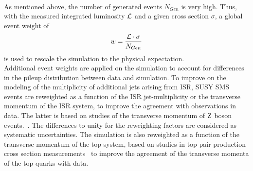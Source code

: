 \\
As mentioned above, the number of generated events $N_{Gen}$ is very high. Thus, with the measured integrated luminosity $\mathcal{L}$ and a given cross section $\sigma$, a global event weight of
\begin{equation}
 w = \frac{\mathcal{L} \cdot \sigma}{N_{Gen}}
\end{equation}
is used to rescale the simulation to the physical expectation.\\
Additional event weights are applied on the simulation to account for differences in the pileup distribution between data and simulation. To improve on the \MADGRAPH modeling of the multiplicity of additional jets arising from ISR, SUSY SMS events are reweighted as a function of the ISR jet-multiplicity or the transverse momentum of the ISR system, to improve the agreement with observations in data.
The latter is based on studies of the transverse momentum of $\mathrm{Z}$ boson events.~\cite{NISRweight}.
The differences to unity for the reweighting factors are considered as systematic uncertainties.
The \POWHEG \ttbar simulation is also reweighted as a function of the transverse momentum of the top system, based on studies in top pair production cross section measurements~\cite{topWeight1,topWeight2,topWeight3,topWeight4} to improve the agreement of the transverse momenta of the top quarks with data.


